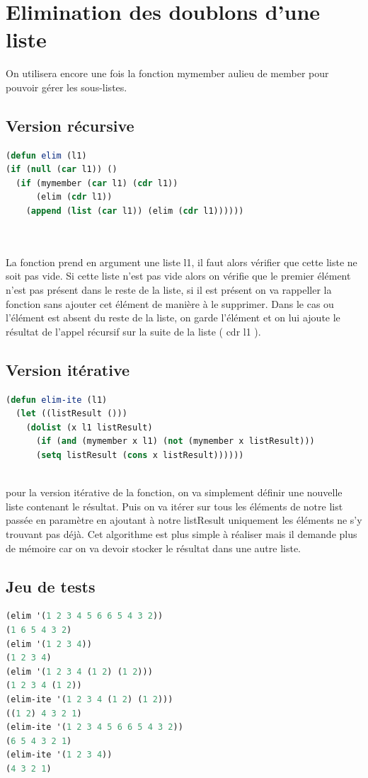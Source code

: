 \documentclass[a4paper,10pt]{report}
\begin{document}
      \section{Elimination des doublons d'une liste}
      On utilisera encore une fois la fonction mymember aulieu de member pour pouvoir gérer les sous-listes.
      \subsection{Version récursive}
	\begin{lstlisting}[language=Lisp]
(defun elim (l1)
(if (null (car l1)) ()
  (if (mymember (car l1) (cdr l1))
      (elim (cdr l1))
    (append (list (car l1)) (elim (cdr l1))))))
	
	
	\end{lstlisting}
      
      La fonction prend en argument une liste l1, il faut alors vérifier que cette liste ne soit pas vide. Si cette liste n'est pas vide alors on vérifie que le premier élément
      n'est pas présent dans le reste de la liste, si il est présent on va rappeller la fonction sans ajouter cet élément de manière à le supprimer. Dans le cas ou l'élément
      est absent du reste de la liste, on garde l'élément et on lui ajoute le résultat de l'appel récursif sur la suite de la liste ( cdr l1 ).
      

      \subsection{Version itérative}
	\begin{lstlisting}[language=Lisp]
(defun elim-ite (l1)
  (let ((listResult ()))
    (dolist (x l1 listResult)
      (if (and (mymember x l1) (not (mymember x listResult)))
	  (setq listResult (cons x listResult))))))
	
	\end{lstlisting}

	pour la version itérative de la fonction, on va simplement définir une nouvelle liste contenant le résultat. Puis on va itérer sur tous les éléments de notre list passée en 
	paramètre en ajoutant à notre listResult uniquement les éléments ne s'y trouvant pas déjà.\newline
	Cet algorithme est plus simple à réaliser mais il demande plus de mémoire car on va devoir stocker le résultat dans une autre liste.
	   \subsection{Jeu de tests}
	  \begin{lstlisting}[language=Lisp]
(elim '(1 2 3 4 5 6 6 5 4 3 2))
(1 6 5 4 3 2)
(elim '(1 2 3 4))
(1 2 3 4)
(elim '(1 2 3 4 (1 2) (1 2)))
(1 2 3 4 (1 2))
(elim-ite '(1 2 3 4 (1 2) (1 2)))
((1 2) 4 3 2 1)
(elim-ite '(1 2 3 4 5 6 6 5 4 3 2))
(6 5 4 3 2 1)
(elim-ite '(1 2 3 4))
(4 3 2 1)

		 \end{lstlisting}
		 \newpage
\end{document}
